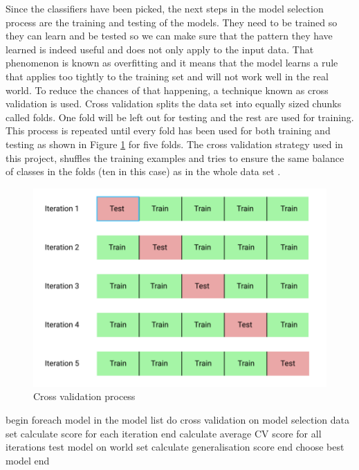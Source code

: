 Since the classifiers have been picked, the next steps in the model selection process are the training and testing of the models. They need to be trained so they can learn and be tested so we can make sure that the pattern they have learned is indeed useful and does not only apply to the input data. That phenomenon is known as overfitting and it means that the model learns a rule that applies too tightly to the training set and will not work well in the real world. To reduce the chances of that happening, a technique known as cross validation is used. Cross validation splits the data set into equally sized chunks called folds. One fold will be left out for testing and the rest are used for training. This process is repeated until every fold has been used for both training and testing as shown in Figure \ref{fig:cv} for five folds. The cross validation strategy used in this project, shuffles the training examples and tries to ensure the same balance of classes in the folds (ten in this case) as in the whole data set \cite{SratifiedCv:online}. 

\begin{figure}[h]
\centering
\includegraphics[width=0.7\linewidth]{methodology/fig/cv.png}
\caption{Cross validation process \cite{CrossVal24:online}}
\label{fig:cv}
\end{figure}

\begin{algorithm}[caption={"Model selection algorithm"}, label={alg2}]
begin
    foreach model in the model list
      do cross validation on model selection data set
        calculate score for each iteration
      end
      calculate average CV score for all iterations
      test model on world set
      calculate generalisation score
    end
    choose best model
end
    
\end{algorithm}



